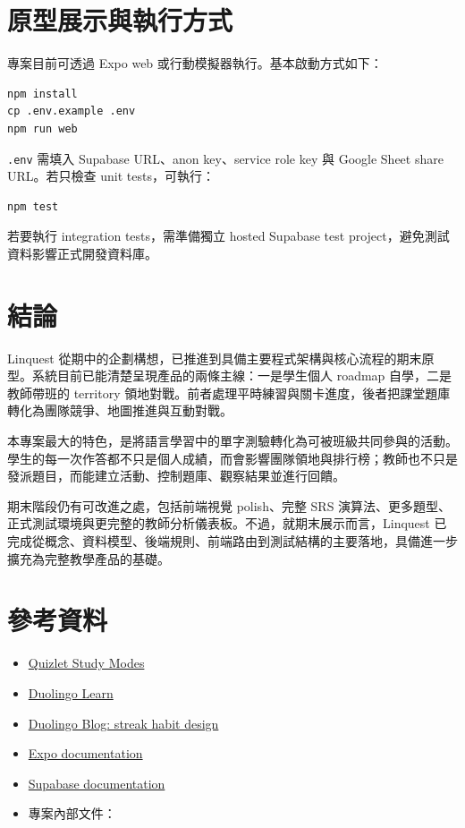 \documentclass[12pt,a4paper]{article}
\begin{document}
\section{原型展示與執行方式}

專案目前可透過 Expo web 或行動模擬器執行。基本啟動方式如下：

\begin{verbatim}
npm install
cp .env.example .env
npm run web
\end{verbatim}

\texttt{.env} 需填入 Supabase URL、anon key、service role key 與 Google Sheet share URL。若只檢查 unit tests，可執行：

\begin{verbatim}
npm test
\end{verbatim}

若要執行 integration tests，需準備獨立 hosted Supabase test project，避免測試資料影響正式開發資料庫。

\section{結論}

Linquest 從期中的企劃構想，已推進到具備主要程式架構與核心流程的期末原型。系統目前已能清楚呈現產品的兩條主線：一是學生個人 roadmap 自學，二是教師帶班的 territory 領地對戰。前者處理平時練習與關卡進度，後者把課堂題庫轉化為團隊競爭、地圖推進與互動對戰。

本專案最大的特色，是將語言學習中的單字測驗轉化為可被班級共同參與的活動。學生的每一次作答都不只是個人成績，而會影響團隊領地與排行榜；教師也不只是發派題目，而能建立活動、控制題庫、觀察結果並進行回饋。

期末階段仍有可改進之處，包括前端視覺 polish、完整 SRS 演算法、更多題型、正式測試環境與更完整的教師分析儀表板。不過，就期末展示而言，Linquest 已完成從概念、資料模型、後端規則、前端路由到測試結構的主要落地，具備進一步擴充為完整教學產品的基礎。

\section*{參考資料}

\begin{itemize}
  \item \href{https://quizlet.com/en-gb/features/study-modes}{Quizlet Study Modes}
  \item \href{https://www.duolingo.com/learn}{Duolingo Learn}
  \item \href{https://blog.duolingo.com/how-duolingo-streak-builds-habit/}{Duolingo Blog: streak habit design}
  \item \href{https://docs.expo.dev/}{Expo documentation}
  \item \href{https://supabase.com/docs}{Supabase documentation}
  \item 專案內部文件：
\end{itemize}
\end{document}
